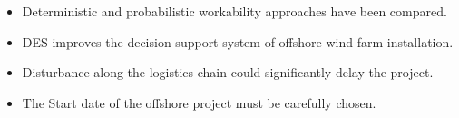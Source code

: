 \begin{highlights}
    \begin{itemize}
        \item Deterministic and probabilistic workability approaches have been compared.
        \item DES improves the decision support system of offshore wind farm installation.
        \item Disturbance along the logistics chain could significantly delay the project.
        \item The Start date of the offshore project must be carefully chosen.
    \end{itemize}
\end{highlights}